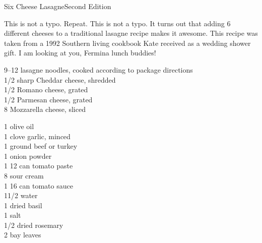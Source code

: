 \begin{entry}{Six Cheese Lasagne}{Second Edition}

\begin{open}
  This is not a typo. Repeat. This is not a typo. It turns out that adding 6
  different cheeses to a traditional lasagne recipe makes it awesome. This
  recipe was taken from a 1992 Southern living cookbook Kate received as a
  wedding shower gift. I am looking at you, Fermina lunch buddies!
\end{open}

\begin{ingredients}
\numrange{9}{12} lasagne noodles, cooked according to package directions\\
\SI{1/2}{\cup} sharp Cheddar cheese, shredded\\
\SI{1/2}{\cup} Romano cheese, grated\\
\SI{1/2}{\cup} Parmesan cheese, grated \\
\SI{8}{\ounce} Mozzarella cheese, sliced
\end{ingredients}

\begin{ingredients}
    \SI{1}{\tblspoon} olive oil\\
    1 clove garlic, minced\\
    \SI{1}{\ounce} ground beef or turkey \\
    \SI{1}{\teaspoon} onion powder\\
    1 \SI{12}{\ounce} can tomato paste\\
    \SI{8}{\ounce} sour cream\\
    1 \SI{16}{\ounce} can tomato sauce\\
    1\SI{1/2}{\cup} water\\
    \SI{1}{\tblspoon} dried basil\\
    \SI{1}{\teaspoon} salt\\
    \SI{1/2}{\teaspoon} dried rosemary\\
    2 bay leaves
\end{ingredients}


\end{entry}
